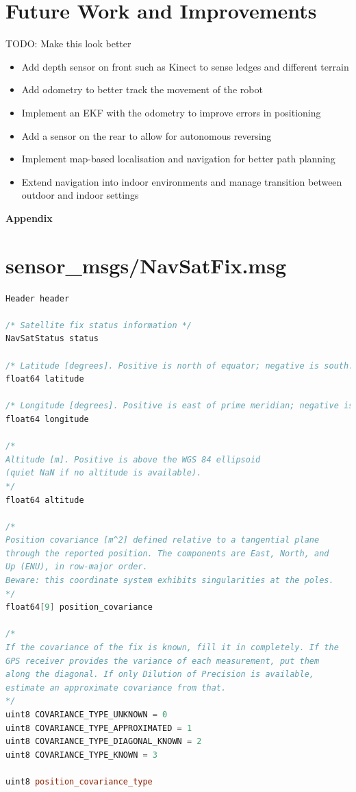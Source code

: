\documentclass[titlepage,12pt,a4paper]{article}
\begin{document}
\section{Future Work and Improvements}
TODO: Make this look better
\begin{itemize}
	\item Add depth sensor on front such as Kinect to sense ledges and different terrain
	\item Add odometry to better track the movement of the robot
	\item Implement an EKF with the odometry to improve errors in positioning
	\item Add a sensor on the rear to allow for autonomous reversing
	\item Implement map-based localisation and navigation for better path planning
	\item Extend navigation into indoor environments and manage transition between outdoor and indoor settings
\end{itemize}

\pagebreak
{\huge \textbf{Appendix}}
\appendix
\addappheadtotoc
\section{sensor\_msgs/NavSatFix.msg}
\label{appendix:NavSatFix.msg}
\begin{lstlisting}[language=C++]
Header header

/* Satellite fix status information */
NavSatStatus status

/* Latitude [degrees]. Positive is north of equator; negative is south. */
float64 latitude

/* Longitude [degrees]. Positive is east of prime meridian; negative is west. */
float64 longitude

/*
Altitude [m]. Positive is above the WGS 84 ellipsoid
(quiet NaN if no altitude is available).
*/
float64 altitude

/*
Position covariance [m^2] defined relative to a tangential plane
through the reported position. The components are East, North, and
Up (ENU), in row-major order.
Beware: this coordinate system exhibits singularities at the poles.
*/
float64[9] position_covariance

/*
If the covariance of the fix is known, fill it in completely. If the
GPS receiver provides the variance of each measurement, put them
along the diagonal. If only Dilution of Precision is available,
estimate an approximate covariance from that.
*/
uint8 COVARIANCE_TYPE_UNKNOWN = 0
uint8 COVARIANCE_TYPE_APPROXIMATED = 1
uint8 COVARIANCE_TYPE_DIAGONAL_KNOWN = 2
uint8 COVARIANCE_TYPE_KNOWN = 3

uint8 position_covariance_type
\end{lstlisting}
\pagebreak
\end{document}
